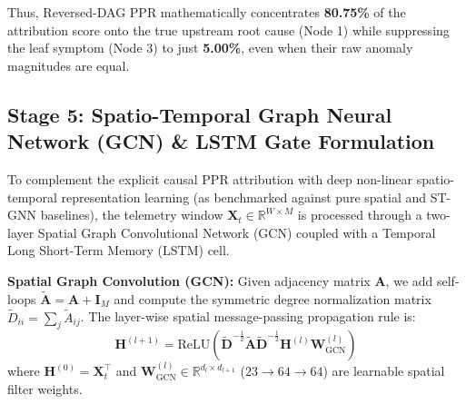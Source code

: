 Thus, Reversed-DAG PPR mathematically concentrates \textbf{80.75\%} of the attribution score onto the true upstream root cause (Node 1) while suppressing the leaf symptom (Node 3) to just \textbf{5.00\%}, even when their raw anomaly magnitudes are equal.

\subsection{Stage 5: Spatio-Temporal Graph Neural Network (GCN) \& LSTM Gate Formulation}
To complement the explicit causal PPR attribution with deep non-linear spatio-temporal representation learning (as benchmarked against pure spatial and ST-GNN baselines), the telemetry window $\mathbf{X}_t \in \mathbb{R}^{W \times M}$ is processed through a two-layer Spatial Graph Convolutional Network (GCN) coupled with a Temporal Long Short-Term Memory (LSTM) cell.

\textbf{Spatial Graph Convolution (GCN):} Given adjacency matrix $\mathbf{A}$, we add self-loops $\tilde{\mathbf{A}} = \mathbf{A} + \mathbf{I}_M$ and compute the symmetric degree normalization matrix $\tilde{D}_{ii} = \sum_j \tilde{A}_{ij}$. The layer-wise spatial message-passing propagation rule is:
\begin{equation}
\mathbf{H}^{(l+1)} = \text{ReLU}\left( \tilde{\mathbf{D}}^{-\frac{1}{2}} \tilde{\mathbf{A}} \tilde{\mathbf{D}}^{-\frac{1}{2}} \mathbf{H}^{(l)} \mathbf{W}_{\text{GCN}}^{(l)} \right)
\label{eq:gcn_layer}
\end{equation}
where $\mathbf{H}^{(0)} = \mathbf{X}_t^\top$ and $\mathbf{W}_{\text{GCN}}^{(l)} \in \mathbb{R}^{d_l \times d_{l+1}}$ ($23 \to 64 \to 64$) are learnable spatial filter weights.

